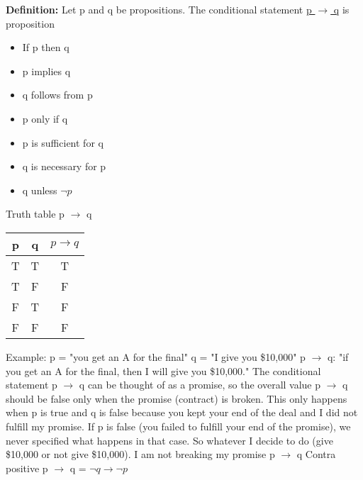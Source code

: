 \documentclass{article}
\begin{document}
\hfill \break
\textbf{Definition:} Let p and q be propositions. The conditional statement \underline{p $\rightarrow$ q} is proposition
\begin{itemize}
    \item If p then q
    \item p implies q
    \item q follows from p
    \item p only if q
    \item p is sufficient for q
    \item q is necessary for p
    \item q unless $\neg p$
\end{itemize}
Truth table p $\rightarrow$ q
\begin{center}
\begin{tabular}{ |c|c|c| } 
 \hline
 p & q & $p \rightarrow q$ \\ 
 \hline
 T & T & T \\ 
 T & F & F \\
 F & T & F \\
 F & F & F \\
 \hline
\end{tabular}
\end{center}
Example:
\hfill \break
p = "you get an A for the final"
\hfill \break
q = "I give you \$10,000"
\hfill \break
p $\rightarrow$ q: "if you get an A for the final, then I will give you \$10,000."
\hfill \break
The conditional statement p $\rightarrow$ q can be thought of as a promise, so the overall value p $\rightarrow$ q should be false only when the promise (contract) is broken. This only happens when p is true and q is false because you kept your end of the deal and I did not fulfill my promise. If p is false (you failed to fulfill your end of the promise), we never specified what happens in that case. So whatever I decide to do (give \$10,000 or not give \$10,000). I am not breaking my promise
\hfill \break
p $\rightarrow$ q
\hfill \break
Contra positive
\hfill \break
p $\rightarrow$ q = $\neg q \rightarrow \neg p$
\end{document}
